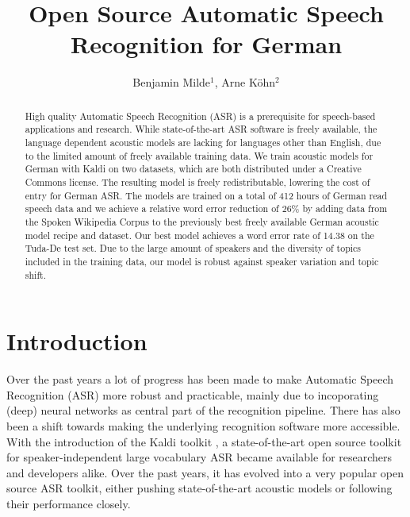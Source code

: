 \documentclass[a4paper]{article}
\title{Open Source Automatic Speech Recognition for German}
\author{Benjamin Milde$^1$, Arne Köhn$^2$}
\begin{document}
\maketitle

\begin{abstract}

  High quality Automatic Speech Recognition (ASR) is a prerequisite
  for speech-based applications and research. While state-of-the-art
  ASR software is freely available, the language dependent acoustic
  models are lacking for languages other than English, due to the
  limited amount of freely available training data.
We train acoustic models for German with Kaldi on two datasets, which are both
  distributed under a Creative Commons license. The resulting model
  is freely redistributable, lowering the cost of entry for German
  ASR. The models are trained on a total of 412 hours of German read speech data and we achieve a relative word error reduction of 26\% by adding data from the Spoken Wikipedia Corpus to the previously best
  freely available German acoustic model recipe and dataset. Our best model achieves a word error rate of 14.38 on the Tuda-De test set. 
Due to the large amount of speakers and the diversity of topics
  included in the training data, our model is robust against speaker
  variation and topic shift.
  
\end{abstract}


\section{Introduction}
\label{sec:introduction}

Over the past years a lot of progress has been made to make Automatic Speech Recognition (ASR) more robust and practicable, mainly due to incoporating (deep) neural networks as central part of the recognition pipeline. There has also been a shift towards making the underlying recognition software more accessible. With the introduction of the Kaldi toolkit \cite{povey2011kaldi}, a state-of-the-art open source toolkit for speaker-independent large vocabulary ASR became available for researchers and developers alike. Over the past years, it has evolved into a very popular open source ASR toolkit, either pushing state-of-the-art acoustic models or following their performance closely.
\end{document}
